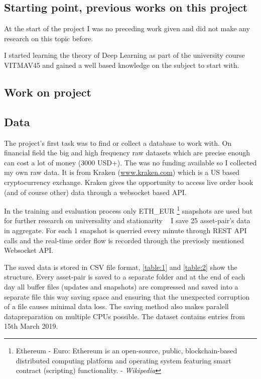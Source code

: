 \documentclass[11pt,a4paper,oneside]{article}
\begin{document}
\subsection{Starting point, previous works on this project}
\label{sec:prev_works}

At the start of the project I was no preceding work given and did not make any research on this topic before.

I started learning the theory of Deep Learning as part of the university course VITMAV45 and gained a well based 
knowledge on the subject to start with.

\newpage
\begin{center}
  \section{Work on project}
  \label{sec:work}
\end{center}

\subsection{Data}
\label{sec:data}

The project's first task was to find or collect a database to work with. On financial field the big and high frequency 
raw datasets which are precise enough can cost a lot of money (3000 USD+). The was no funding available so I collected 
my own raw data. It is from Kraken (\url{www.kraken.com}) which is a US based cryptocurrency exchange. Kraken gives the 
opportunity to access live order book (and of course other) data through a websocket based API. 

In the training and evaluation process only ETH\_EUR \footnote{Ethereum - Euro: Ethereum is an open-source, public, 
blockchain-based distributed computing platform and operating system featuring smart contract (scripting) functionality. 
- \textit{Wikipedia} } snapshots are used but for further research on universality and stationarity ~\cite{univ} I save 
25 asset-pair's data in aggregate. For each 1 snapshot is querried every minute through REST API calls and the 
real-time order flow is recorded through the previosly mentioned Websocket API. 

The saved data is stored in CSV file format, \autoref{table:1} and \autoref{table:2} show the structure. Every 
asset-pair is saved to a separate folder and at the end of each day all buffer files (updates and snapshots) are 
compressed and saved into a separate file this way saving space and ensuring that the unexpected corruption of a file 
causes minimal data loss. The saving method also makes paralell datapreparation on multiple CPUs possible. 
The dataset contains entries from 15th March 2019.
\end{document}
